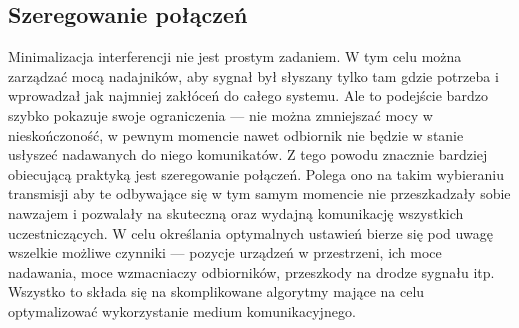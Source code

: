 \documentclass[11pt,a4paper,onecolumn,twoside]{mwart}
\begin{document}
\subsection{Szeregowanie połączeń}
Minimalizacja interferencji nie jest prostym zadaniem. W tym celu można
zarządzać mocą nadajników, aby sygnał był słyszany tylko tam gdzie potrzeba
i wprowadzał jak najmniej zakłóceń do całego systemu. Ale to podejście bardzo
szybko pokazuje swoje ograniczenia --- nie można zmniejszać mocy
w nieskończoność, w pewnym momencie nawet odbiornik nie będzie w stanie usłyszeć
nadawanych do niego komunikatów. Z tego powodu znacznie bardziej obiecującą
praktyką jest szeregowanie połączeń. Polega ono na takim wybieraniu transmisji
aby te odbywające się w tym samym momencie nie przeszkadzały sobie nawzajem
i pozwalały na skuteczną oraz wydajną komunikację wszystkich uczestniczących.
W celu określania optymalnych ustawień bierze się pod uwagę wszelkie możliwe
czynniki --- pozycje urządzeń w przestrzeni, ich moce nadawania, moce
wzmacniaczy odbiorników, przeszkody na drodze sygnału itp. Wszystko to składa
się na skomplikowane algorytmy mające na celu optymalizować wykorzystanie
medium komunikacyjnego.
\end{document}
